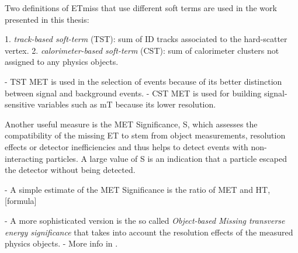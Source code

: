 Two definitions of ETmiss that use different soft terms are used in the work presented in this thesis:

1. \emph{track-based soft-term} (TST): sum of ID tracks associated to the hard-scatter vertex.
2. \emph{calorimeter-based soft-term} (CST): sum of calorimeter clusters not assigned to any physics objects.

- TST MET is used in the selection of events because of its better distinction between signal and background events. 
- CST MET is used for building signal-sensitive variables such as mT because its lower resolution.




Another useful measure is the MET Significance, S, which assesses the compatibility of the missing ET to stem from object measurements, resolution effects or detector inefficiencies and thus helps to detect events with non-interacting particles. 
A large value of S is an indication that a particle escaped the detector without being detected.

- A simple estimate of the MET Significance is the ratio of MET and HT, [formula]

- A more sophisticated version is the so called \emph{Object-based Missing transverse energy significance} that takes into account the resolution effects of the measured physics objects. 
- More info in \cite{ATLAS-CONF-2018-038}.


